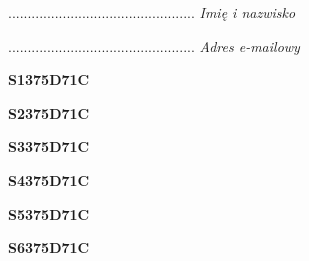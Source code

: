\begin{turn}{90}\begin{minipage}{\linewidth} \vspace{20mm} ................................................  \textit{Imię i nazwisko}\end{minipage}\end{turn}

\begin{turn}{90}\begin{minipage}{\linewidth} \vspace{20mm} ................................................  \textit{Adres e-mailowy}\end{minipage}\end{turn}

\begin{turn}{90}\huge \begin{minipage}{\linewidth} \vspace{10mm}\textbf{S1375D71C}\end{minipage}\end{turn}

\begin{turn}{90}\huge \begin{minipage}{\linewidth} \vspace{10mm}\textbf{S2375D71C}\end{minipage}\end{turn}

\begin{turn}{90}\huge \begin{minipage}{\linewidth} \vspace{10mm}\textbf{S3375D71C}\end{minipage}\end{turn}

\begin{turn}{90}\huge \begin{minipage}{\linewidth} \vspace{10mm}\textbf{S4375D71C}\end{minipage}\end{turn}

\begin{turn}{90}\huge \begin{minipage}{\linewidth} \vspace{10mm}\textbf{S5375D71C}\end{minipage}\end{turn}

\begin{turn}{90}\huge \begin{minipage}{\linewidth} \vspace{10mm}\textbf{S6375D71C}\end{minipage}\end{turn}

